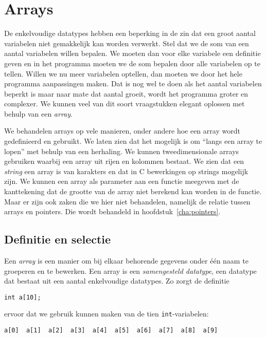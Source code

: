 \chapter{Arrays}
\label{cha:arrays}
\thispagestyle{empty}

De enkelvoudige datatypes hebben een beperking in de zin dat een groot aantal variabelen niet gemakkelijk kan worden verwerkt. Stel dat we de som van een aantal variabelen willen bepalen. We moeten dan voor elke variabele een definitie geven en in het programma moeten we de som bepalen door alle variabelen op te tellen. Willen we nu meer variabelen optellen, dan moeten we door het hele programma aanpassingen maken. Dat is nog wel te doen als het aantal variabelen beperkt is maar naar mate dat aantal groeit, wordt het programma groter en complexer. We kunnen veel van dit soort vraagstukken elegant oplossen met behulp van een \textsl{array}.

We behandelen arrays op vele manieren, onder andere hoe een array wordt gedefinieerd en gebruikt. We laten zien dat het mogelijk is om ``langs een array te lopen'' met behulp van een herhaling. We kunnen tweedimensionale arrays gebruiken waarbij een array uit rijen en kolommen bestaat. We zien dat een \textsl{string} een array is van karakters en dat in C bewerkingen op strings mogelijk zijn. We kunnen een array als parameter aan een functie meegeven met de kanttekening dat de grootte van de array niet berekend kan worden in de functie. Maar er zijn ook zaken die we hier niet behandelen, namelijk de relatie tussen arrays en pointers. Die wordt behandeld in hoofdstuk~\ref{cha:pointers}.


\section{Definitie en selectie}
Een \textsl{array} is een manier om bij elkaar behorende gegevens onder één naam te groeperen en te bewerken. Een array is een \textsl{samengesteld datatype}, een datatype dat bestaat uit een aantal enkelvoudige datatypes.
Zo zorgt de definitie

\begin{lstlisting}[style=lstoneline]
int a[10];
\end{lstlisting}

ervoor dat we gebruik kunnen maken van de tien \texttt{int}-variabelen:

\begin{lstlisting}[style=lstoneline]
a[0]  a[1]  a[2]  a[3]  a[4]  a[5]  a[6]  a[7]  a[8]  a[9]
\end{lstlisting}


